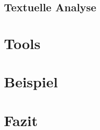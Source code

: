 \documentclass[runningheads,a4paper]{llncs}
\begin{document}
\subsection{Textuelle Analyse}

\section{Tools}
\section{Beispiel}
\section{Fazit}

\cleardoublepage

\end{document}

